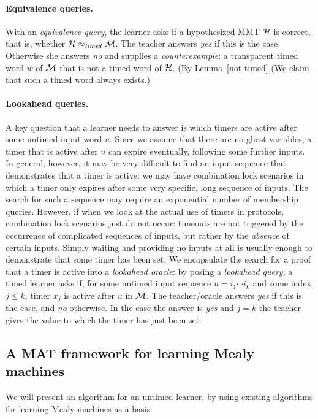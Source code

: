 \paragraph{Equivalence queries.}
With an \emph{equivalence query}, the learner asks if a hypothesized MMT ${\cal H}$ is correct, that is, 
whether ${\cal H} \approx_{\mathit{timed}} {\cal M}$.
The teacher answers \emph{yes} if this is the case. Otherwise she answers \emph{no} and supplies a
\emph{counterexample}: a transparent timed word $w$ of ${\cal M}$ that is not a timed word of ${\cal H}$.
\iflong
(By Lemma~\ref{not timed} 
\else
(We claim that
\fi
such a timed word always exists.)

\paragraph{Lookahead queries.}
A key question that a learner needs to answer is which timers are active after some untimed input word $u$.
Since we assume that there are no ghost variables, a timer that is active after $u$ can expire eventually,
following some further inputs.
In general, however, it may be very difficult to find an input sequence that demonstrates that a timer is active: we may have combination lock scenarios
in which a timer only expires after some very specific, long sequence of inputs.
The search for such a sequence may require an exponential number of membership queries.
However, if when we look at the actual use of timers in protocols, combination lock scenarios just do not occur:
timeouts are not triggered by the occurrence of complicated sequences of inputs, 
but rather by the \emph{absence} of certain inputs.
Simply waiting and providing no inputs at all is usually enough to demonstrate that some timer has been set.
We encapsulate the search for a proof that a timer is active into a \emph{lookahead oracle}:
by posing a \emph{lookahead query}, a timed learner asks if, for some untimed input sequence $u = i_1 \cdots i_k$ and some
index $j \leq k$, timer $x_j$ is active after $u$ in ${\cal M}$.
The teacher/oracle answers \emph{yes} if this is the case, and \emph{no} otherwise.
In the case the answer is \emph{yes} and $j=k$ the teacher gives the value to which the timer has just been set.

\subsection{A MAT framework for learning Mealy machines}
We will present an algorithm for an untimed learner, by using existing algorithms for learning Mealy machines as a basis.

